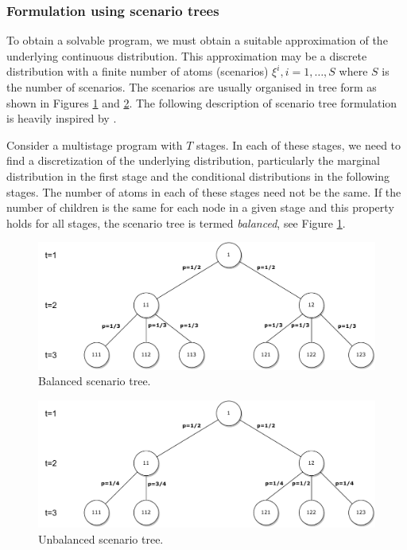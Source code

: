 \subsubsection{Formulation using scenario trees}
To obtain a solvable program, we must obtain a suitable approximation of the underlying continuous distribution. This approximation may be a discrete distribution with a finite number of atoms (scenarios) $\xi^i, i=1,\dots,S$ where $S$ is the number of scenarios. The scenarios are usually organised in tree form as shown in Figures \ref{fig:balanced_scenario_tree} and \ref{fig:unbalanced_scenario_tree}. The following description of scenario tree formulation is heavily inspired by \cite[Section 2]{dupacova_scenarios_for_multistage_stochastic_programs}.

Consider a multistage program with $T$ stages. In each of these stages, we need to find a discretization of the underlying distribution, particularly the marginal distribution in the first stage and the conditional distributions in the following stages. The number of atoms in each of these stages need not be the same. If the number of children is the same for each node in a given stage and this property holds for all stages, the scenario tree is termed \textit{balanced}, see Figure \ref{fig:balanced_scenario_tree}.

\begin{figure}[H]
  \includegraphics[width=\linewidth]{../img/scenario_tree_balanced.pdf}
  \caption{Balanced scenario tree.}
  \label{fig:balanced_scenario_tree}
\end{figure}


\begin{figure}[H]
  \includegraphics[width=\linewidth]{../img/scenario_tree_unbalanced.pdf}
  \caption{Unbalanced scenario tree.}
  \label{fig:unbalanced_scenario_tree}
\end{figure}

